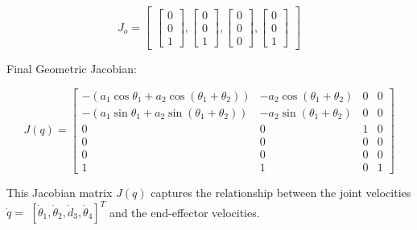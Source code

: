 \documentclass[12pt]{report}
\begin{document}
\begin{equation}
	J_o = 
	\begin{bmatrix}
		\begin{bmatrix}
			0 \\ 
			0 \\ 
			1
		\end{bmatrix}, 
		\begin{bmatrix}
			0 \\ 
			0 \\ 
			1
		\end{bmatrix}, 
		\begin{bmatrix}
			0 \\ 
			0 \\ 
			0
		\end{bmatrix}, 
		\begin{bmatrix}
			0 \\ 
			0 \\ 
			1
		\end{bmatrix}
	\end{bmatrix}
\end{equation}

Final Geometric Jacobian:

\begin{equation}
	J(q) =
	\begin{bmatrix}
		-\left(a_1 \cos \theta_1 + a_2 \cos (\theta_1 + \theta_2)\right) & -a_2 \cos (\theta_1 + \theta_2) & 0 & 0 \\
		-\left(a_1 \sin \theta_1 + a_2 \sin (\theta_1 + \theta_2)\right) & -a_2 \sin (\theta_1 + \theta_2) & 0 & 0 \\
		0 & 0 & 1 & 0 \\
		0 & 0 & 0 & 0 \\
		0 & 0 & 0 & 0 \\
		1 & 1 & 0 & 1
	\end{bmatrix}
\end{equation}


This Jacobian matrix $J(q)$ captures the relationship between the joint velocities $\dot{q}=$ $\left[\dot{\theta}_1, \dot{\theta}_2, \dot{d}_3, \dot{\theta}_4\right]^T$ and the end-effector velocities. 
\end{document}
